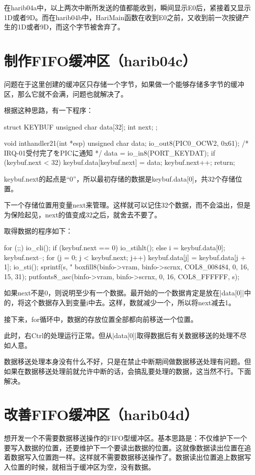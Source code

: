 在harib04a中，以上两次中断所发送的值都能收到，瞬间显示E0后，紧接着又显示1D或者9D。而在harib04b中，HariMain函数在收到E0之前，又收到前一次按键产生的1D或者9D，而这个字节被舍弃了。

\section{	制作FIFO缓冲区（harib04c）	}
问题在于这里创建的缓冲区只存储一个字节，如果做一个能够存储多字节的缓冲区，那么它就不会满，问题也就解决了。

根据这种思路，有一下程序：
\begin{code}
struct KEYBUF {
	unsigned char data[32];
	int next;
};

void inthandler21(int *esp)
{
	unsigned char data;
	io_out8(PIC0_OCW2, 0x61);	/* IRQ-01受付完了をPICに通知 */
	data = io_in8(PORT_KEYDAT);
	if (keybuf.next < 32) {
		keybuf.data[keybuf.next] = data;
		keybuf.next++;
	}
	return;
}
\end{code}

keybuf.next的起点是“0”，所以最初存储的数据是keybuf.data[0]，共32个存储位置。

下一个存储位置用变量next来管理。这样就可以记住32个数据，而不会溢出，但是为保险起见，next的值变成32之后，就舍去不要了。

\cs

取得数据的程序如下：

\begin{code}
	for (;;) {
		io_cli();
		if (keybuf.next == 0) {
			io_stihlt();
		} else {
			i = keybuf.data[0];
			keybuf.next--;
			for (j = 0; j < keybuf.next; j++) {
				keybuf.data[j] = keybuf.data[j + 1];
			}
			io_sti();
			sprintf(s, "%
			boxfill8(binfo->vram, binfo->scrnx, COL8_008484, 0, 16, 15, 31);
			putfonts8_asc(binfo->vram, binfo->scrnx, 0, 16, COL8_FFFFFF, s);
		}
	}
\end{code}

如果next不是0，则说明至少有一个数据。最开始的一个数据肯定是放在|data[0]|中的，将这个数据存入到变量i中去。这样，数就减少一个，所以将next减去1。

接下来，for循环中，数据的存放位置全部都向前移送一个位置。

\cs
此时，右Ctrl的处理运行正常。但从|data[0]|取得数据后有关数据移送的处理不尽如人意。

数据移送处理本身没有什么不好，只是在禁止中断期间做数据移送处理有问题。但如果在数据移送处理前就允许中断的话，会搞乱要处理的数据，这当然不行。下面解决。
\section{	改善FIFO缓冲区（harib04d）	}
想开发一个不需要数据移送操作的FIFO型缓冲区。基本思路是：不仅维护下一个要写入数据的位置，还要维护下一个要读出数据的位置。这就像数据读出位置在追着数据写入位置跑一样。这样就不需要数据移送操作了。数据读出位置追上数据写入位置的时候，就相当于缓冲区为空，没有数据。

